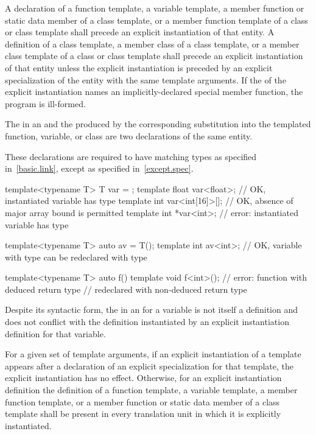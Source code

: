 \pnum
A declaration of a function template, a variable template, a member function
or static data member
of a class template, or a member function template of a class or class
template shall precede an explicit instantiation of that entity. A definition
of a class template, a member class of a class template, or a member class
template of a class or class template shall precede an explicit instantiation
of that entity unless the explicit instantiation is preceded by an explicit
specialization of the entity with the same template arguments.
If the
of the explicit instantiation names an implicitly-declared special member
function, the program is ill-formed.

\pnum
The  in an  and
the  produced by the corresponding substitution
into the templated function, variable, or class
are two declarations of the same entity.
\begin{note}
These declarations are required to have matching types as specified in~\ref{basic.link}, except as specified in~\ref{except.spec}.
\begin{example}
\begin{codeblock}
template<typename T> T var = {};
template float var<float>;      // OK, instantiated variable has type 
template int var<int[16]>[];    // OK, absence of major array bound is permitted
template int *var<int>;         // error: instantiated variable has type 

template<typename T> auto av = T();
template int av<int>;           // OK, variable with type  can be redeclared with type 

template<typename T> auto f() {}
template void f<int>();         // error: function with deduced return type
                                // redeclared with non-deduced return type
\end{codeblock}
\end{example}
\end{note}
Despite its syntactic form, the  in an  for a variable is not itself a definition and does not conflict with the definition instantiated by an explicit instantiation definition for that variable.

\pnum
For a given set of template arguments, if an explicit
instantiation of a template appears after a declaration of
an explicit specialization for that template, the explicit
instantiation has no effect. Otherwise, for an explicit instantiation
definition the definition of a
function template, a variable template, a member
function template, or a member function or static
data member of a class template shall be present in every
translation unit in which it is explicitly instantiated.

